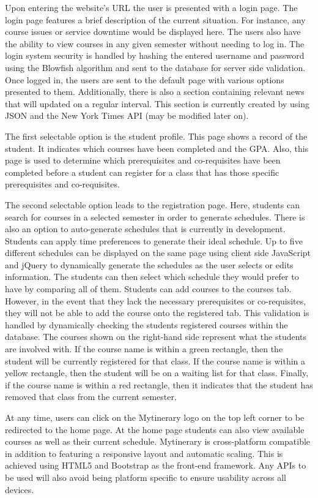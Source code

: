 \documentclass[12pt]{article}
\begin{document}
Upon entering the website’s URL the user is presented with a login page. The login page features a brief description of the current situation. For instance, any course issues or service downtime would be displayed here. The users also have the ability to view courses in any given semester without needing to log in. The login system security is handled by hashing the entered username and password using the Blowfish algorithm and sent to the database for server side validation. 
Once logged in, the users are sent to the default page with various options presented to them.  Additionally, there is also a section containing relevant news that will updated on a regular interval. This section is currently created by using JSON and the New York Times API (may be modified later on). 

The first selectable option is the student profile. This page shows a record of the student. It indicates which courses have been completed and the GPA. Also, this page is used to determine which prerequisites and co-requisites have been completed before a student can register for a class that has those specific prerequisites and co-requisites.

The second selectable option leads to the registration page. Here, students can search for courses in a selected semester in order to generate schedules. There is also an option to auto-generate schedules that is currently in development. Students can apply time preferences to generate their ideal schedule.  Up to five different schedules can be displayed on the same page using client side JavaScript and jQuery to dynamically generate the schedules as the user selects or edits information. The students can then select which schedule they would prefer to have by comparing all of them. Students can add courses to the courses tab. However, in the event that they lack the necessary prerequisites or co-requisites, they will not be able to add the course onto the registered tab. This validation is handled by dynamically checking the students registered courses within the database. The courses shown on the right-hand side represent what the students are involved with. If the course name is within a green rectangle, then the student will be currently registered for that class. If the course name is within a yellow rectangle, then the student will be on a waiting list for that class. Finally, if the course name is within a red rectangle, then it indicates that the student has removed that class from the current semester.

At any time, users can click on the Mytinerary logo on the top left corner to be redirected to the home page. At the home page students can also view available courses as well as their current schedule. Mytinerary is cross-platform compatible in addition to featuring a responsive layout and automatic scaling. This is achieved using HTML5 and Bootstrap as the front-end framework. Any APIs to be used will also avoid being platform specific to ensure usability across all devices.
\end{document}
